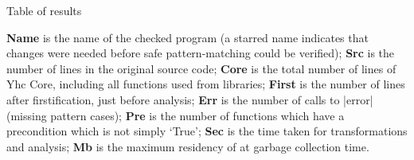 \begin{table}
\caption{Table of results}
\label{tab:results}

\smallskip

\textbf{Name} is the name of the checked program (a starred name indicates that changes were needed before safe pattern-matching could be verified);
\textbf{Src} is the number of lines in the original source code;
\textbf{Core} is the total number of lines of Yhc Core, including all functions used from libraries;
\textbf{First} is the number of lines after firstification, just before analysis;
\textbf{Err} is the number of calls to |error| (missing pattern cases);
\textbf{Pre} is the number of functions which have a precondition which is not simply `True';
\textbf{Sec} is the time taken for transformations and analysis;
\textbf{Mb} is the maximum residency of \catch{} at garbage collection time.

\smallskip\smallskip


\end{table}
